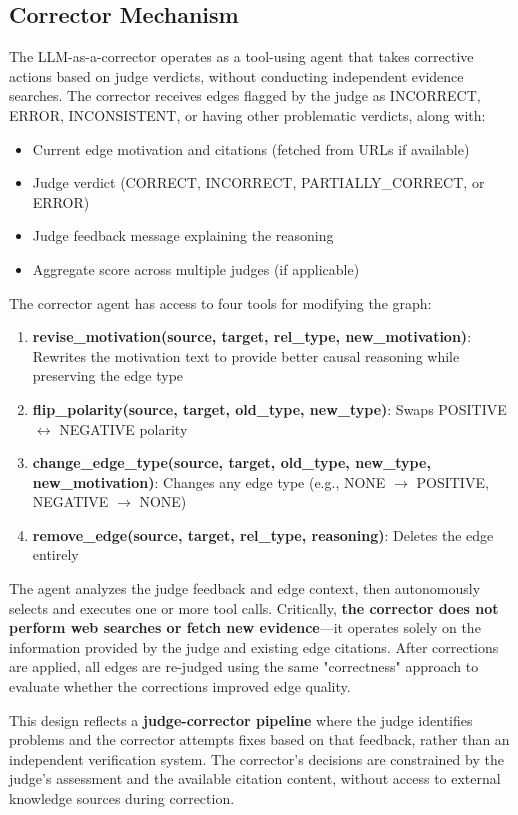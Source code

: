 \subsection{Corrector Mechanism}

The LLM-as-a-corrector operates as a tool-using agent that takes corrective actions based on judge verdicts, without conducting independent evidence searches. The corrector receives edges flagged by the judge as INCORRECT, ERROR, INCONSISTENT, or having other problematic verdicts, along with:

\begin{itemize}
    \item Current edge motivation and citations (fetched from URLs if available)
    \item Judge verdict (CORRECT, INCORRECT, PARTIALLY\_CORRECT, or ERROR)
    \item Judge feedback message explaining the reasoning
    \item Aggregate score across multiple judges (if applicable)
\end{itemize}

The corrector agent has access to four tools for modifying the graph:

\begin{enumerate}
    \item \textbf{revise\_motivation(source, target, rel\_type, new\_motivation)}: Rewrites the motivation text to provide better causal reasoning while preserving the edge type
    \item \textbf{flip\_polarity(source, target, old\_type, new\_type)}: Swaps POSITIVE $\leftrightarrow$ NEGATIVE polarity
    \item \textbf{change\_edge\_type(source, target, old\_type, new\_type, new\_motivation)}: Changes any edge type (e.g., NONE $\rightarrow$ POSITIVE, NEGATIVE $\rightarrow$ NONE)
    \item \textbf{remove\_edge(source, target, rel\_type, reasoning)}: Deletes the edge entirely
\end{enumerate}

The agent analyzes the judge feedback and edge context, then autonomously selects and executes one or more tool calls. Critically, \textbf{the corrector does not perform web searches or fetch new evidence}---it operates solely on the information provided by the judge and existing edge citations. After corrections are applied, all edges are re-judged using the same "correctness" approach to evaluate whether the corrections improved edge quality.

This design reflects a \textbf{judge-corrector pipeline} where the judge identifies problems and the corrector attempts fixes based on that feedback, rather than an independent verification system. The corrector's decisions are constrained by the judge's assessment and the available citation content, without access to external knowledge sources during correction.
